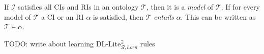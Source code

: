 If $\mathcal{I}$ satisfies all CIs and RIs in an ontology $\mathcal{T}$, then it is a \emph{model} of $\mathcal{T}$. If for every model of $\mathcal{T}$ a CI or an RI $\alpha$ is satisfied, then $\mathcal{T}$ \emph{entails} $\alpha$. This can be written as $\mathcal{T} \models \alpha$.



TODO: write about learning DL-Lite$_{\mathcal{R}, horn}^{\exists}$ rules


